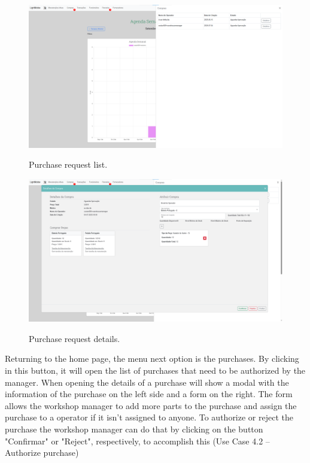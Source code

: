 \begin{figure}[h]
  \caption{Purchase request list.}
  \centering
  \includegraphics[width=\textwidth]{figs/Implementation/workshopmanager/purchaseList}
  \label{fig:figure2}
\end{figure}



\begin{figure}[h]
  \caption{Purchase request details.}
  \centering
  \includegraphics[width=\textwidth]{figs/Implementation/workshopmanager/purchaseDetails}
  \label{fig:figure2}
\end{figure}

Returning to the home page, the menu next option is the purchases.
By clicking in this button, it will open the list of purchases that need to be authorized by the manager.
When opening the details of a purchase will show a modal with the information of the purchase on the left side and a form on the right.
The form allows the workshop manager to add more parts to the purchase and assign the purchase to a operator if it isn't assigned to anyone.
To authorize or reject the purchase the workshop manager can do that by clicking on the button "Confirmar" or "Reject", respectively, to accomplish this (Use Case 4.2 – Authorize purchase)

